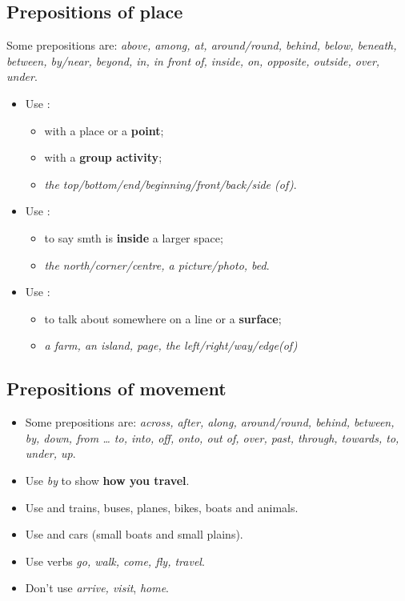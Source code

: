 \subsection{Prepositions of place}
\item Some prepositions are: \textit{above, among, at, around/round, behind, below, beneath, between,
    by/near, beyond, in, in front of, inside, on, opposite, outside, over, under}.
\begin{itemize}
    \item Use :
    \begin{itemize}
        \item with a place or a \textbf{point};
        \item[\daash] with a \textbf{group activity};
        \item[\daash]  \textit{the top/bottom/end/beginning/front/back/side (of)}.
    \end{itemize}
    \item Use :
    \begin{itemize}
        \item to say smth is \textbf{inside} a larger space;
        \item[\daash]  \textit{the north/corner/centre, a picture/photo, bed}.
    \end{itemize}
    \item[\doot] Use :
    \begin{itemize}
        \item[\daash] to talk about somewhere on a line or a \textbf{surface};
        \item[\daash]  \textit{a farm, an island, page, the left/right/way/edge(of)}
    \end{itemize}
\end{itemize}

\subsection{Prepositions of movement}
\begin{itemize}
    \item Some prepositions are: \textit{across, after, along, around/round, behind, between, by, down,
        from \ldots{} to, into, off, onto, out of, over, past, through, towards, to, under, up}.
    \item Use \textit{by} to show \textbf{how you travel}.
    \item Use  and   trains, buses, planes, bikes, boats and animals.
    \item Use  and   cars (small boats and small plains).
    \item Use   verbs \textit{go, walk, come, fly, travel}.
    \item Don't use   \textit{arrive, visit},  \textit{home}.
\end{itemize}

